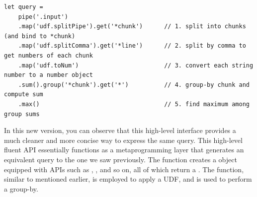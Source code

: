 \documentclass[runningheads]{llncs}
\begin{document}
\begin{lstlisting}[style=JavaScript, columns=flexible]
let query =
    pipe('.input')
    .map('udf.splitPipe').get('*chunk')      // 1. split into chunks (and bind to *chunk)
    .map('udf.splitComma').get('*line')      // 2. split by comma to get numbers of each chunk
    .map('udf.toNum')                        // 3. convert each string number to a number object
    .sum().group('*chunk').get('*')          // 4. group-by chunk and compute sum
    .max()                                   // 5. find maximum among group sums
\end{lstlisting}


In this new version, you can observe that this high-level interface provides a
much cleaner and more concise way to express the same query. 
This high-level fluent API essentially functions as a metaprogramming layer
that generates an equivalent query to the one we saw previously.
The  function creates a  object equipped with
APIs such as , , and so on, all of which return a
.
The  function, similar to  mentioned earlier,
is employed to apply a UDF, and  is used to perform a group-by.


\end{document}
